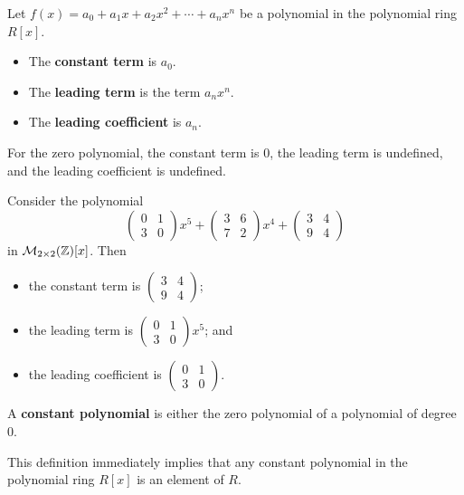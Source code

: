 \begin{definition}
    Let $f(x) = a_0 + a_1x + a_2x^2 + \cdots + a_nx^n$ be a polynomial in the polynomial ring $R[x]$.
    \begin{itemize}
        \item The \textbf{constant term} is $a_0$.
        \item The \textbf{leading term} is the term $a_nx^n$.
        \item The \textbf{leading coefficient} is $a_n$.
    \end{itemize}
\end{definition}
\begin{remark}
    For the zero polynomial, the constant term is 0, the leading term is undefined, and the leading coefficient is undefined.
\end{remark}
\begin{example}
    Consider the polynomial
    \[
        \begin{pmatrix}0&1\\3&0\end{pmatrix}x^5 + \begin{pmatrix}3&6\\7&2\end{pmatrix}x^4 + \begin{pmatrix}3&4\\9&4\end{pmatrix}
    \]
    in $\mathcal{M}_{2\times2}(\mathbb{Z})[x]$. Then
    \begin{itemize}
        \item the constant term is $\begin{pmatrix}3&4\\9&4\end{pmatrix}$;
        \item the leading term is $\begin{pmatrix}0&1\\3&0\end{pmatrix}x^5$; and
        \item the leading coefficient is $\begin{pmatrix}0&1\\3&0\end{pmatrix}$.
    \end{itemize}
\end{example}

\begin{definition}
    A \textbf{constant polynomial} is either the zero polynomial of a polynomial of degree 0.
\end{definition}
\begin{remark}
    This definition immediately implies that any constant polynomial in the polynomial ring $R[x]$ is an element of $R$.
\end{remark}

